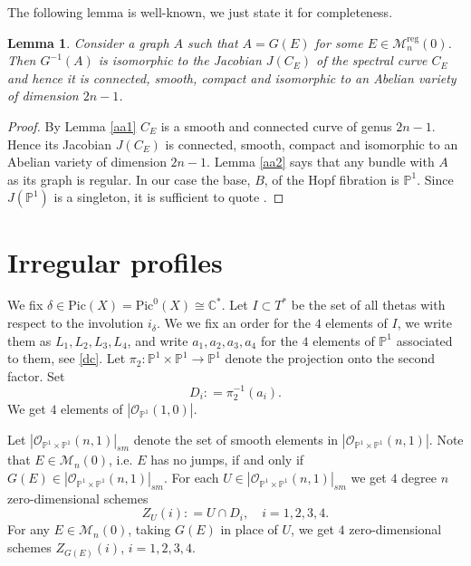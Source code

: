 \documentclass[
  a4paper, 
  reqno, 
  oneside, 
  11pt
]{amsart}
\theoremstyle{plain}	%
\newtheorem{lemma}{Lemma}
\theoremstyle{mydef} %
\theoremstyle{remark}
\theoremstyle{definition}
\theoremstyle{remark}
\DeclareMathOperator{\reg}{reg}
\newcommand{\ce}{\mathrel{\mathop:}=}
\newcommand{\ecomment}[1]{{\color{green} \footnotesize #1}}
\begin{document}
The following lemma is well-known, we just state it  for 
completeness.

\begin{lemma}\label{aa3}
Consider  a graph $A$ such that $A =G(E)$ for some $E\in \mathcal M_n^{\reg}(0)$. Then $G^{-1}(A)$ is isomorphic to the Jacobian $J(C_E)$ of the spectral curve $C_E$
and hence it is connected, smooth, compact and isomorphic to an Abelian variety of dimension $2n-1$.
\end{lemma}



\begin{proof}
By Lemma \ref{aa1} $C_E$ is a smooth and connected curve of genus $2n-1$. Hence its Jacobian $J(C_E)$ is connected, smooth, compact and isomorphic to an Abelian variety of dimension $2n-1$. Lemma \ref{aa2} says that any bundle with $A$ as its graph is regular.
In our case the base, $B$, of the Hopf fibration is $\mathbb P^1$. Since $J(\mathbb P^1)$ is a singleton, it is sufficient to quote \cite[Th. 5.14]{FMW}.
\end{proof}






\section{Irregular profiles}
We fix $\delta\in \mathrm{Pic}(X) =\mathrm{Pic}^0(X)\cong \mathbb C^\ast$. Let $I\subset T^\ast$ be the set of all thetas with respect to the involution $i_\delta$.
We we fix an order for the $4$ elements of $I$,  we write them as $L_1,L_2,L_3,L_4$, and write $a_1, a_2, a_3, a_4$ 
for the $4$ elements of $\mathbb P^1$ associated to them, see \eqref{dc}.
Let $\pi_2\colon \mathbb P^1\times \mathbb P^1\to \mathbb P^1$ denote the projection onto the second factor. 
Set 
$$D_i\ce \pi_2^{-1}(a_i).$$ We get $4$ elements of $|\mathcal O_{\mathbb P^1}(1,0)|$. 

Let  $|\mathcal O_{\mathbb P^1\times \mathbb P^1}(n,1)|_{sm}$ denote the set of smooth elements in $|\mathcal O_{\mathbb P^1\times \mathbb P^1}(n,1)|$.
 Note that $E\in \mathcal M_n(0)$, i.e. $E$ has no jumps, if and only if $G(E)\in |\mathcal O_{\mathbb P^1\times \mathbb P^1}(n,1)|_{sm}$. For each $U\in |\mathcal O_{\mathbb P^1\times \mathbb P^1}(n,1)|_{sm}$ we get $4$ degree $n$ zero-dimensional schemes
 $$Z_U(i)\ce U\cap D_i, \quad  i=1,2,3,4.$$
  For any $E\in \mathcal M_n(0)$, taking $G(E)$ in place of $U$,  we get $4$ zero-dimensional schemes $Z_{G(E)}(i)$, $i=1,2,3,4$.
  
\end{document}
